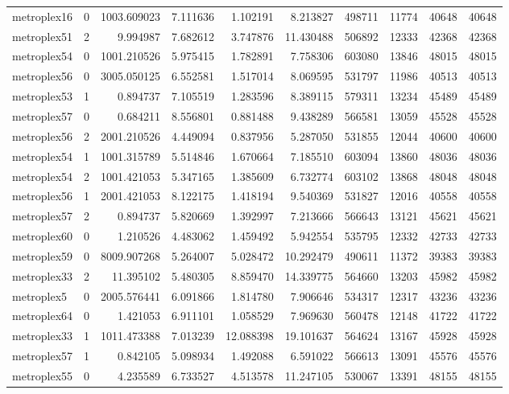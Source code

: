 \begin{longtable}{|l|r|r|r|r|r|r|r|r|r|}
metroplex16 & 0 & 1003.609023 & 7.111636 & 1.102191 & 8.213827 & 498711 & 11774 & 40648 & 40648 \\
metroplex51 & 2 & 9.994987 & 7.682612 & 3.747876 & 11.430488 & 506892 & 12333 & 42368 & 42368 \\
metroplex54 & 0 & 1001.210526 & 5.975415 & 1.782891 & 7.758306 & 603080 & 13846 & 48015 & 48015 \\
metroplex56 & 0 & 3005.050125 & 6.552581 & 1.517014 & 8.069595 & 531797 & 11986 & 40513 & 40513 \\
metroplex53 & 1 & 0.894737 & 7.105519 & 1.283596 & 8.389115 & 579311 & 13234 & 45489 & 45489 \\
metroplex57 & 0 & 0.684211 & 8.556801 & 0.881488 & 9.438289 & 566581 & 13059 & 45528 & 45528 \\
metroplex56 & 2 & 2001.210526 & 4.449094 & 0.837956 & 5.287050 & 531855 & 12044 & 40600 & 40600 \\
metroplex54 & 1 & 1001.315789 & 5.514846 & 1.670664 & 7.185510 & 603094 & 13860 & 48036 & 48036 \\
metroplex54 & 2 & 1001.421053 & 5.347165 & 1.385609 & 6.732774 & 603102 & 13868 & 48048 & 48048 \\
metroplex56 & 1 & 2001.421053 & 8.122175 & 1.418194 & 9.540369 & 531827 & 12016 & 40558 & 40558 \\
metroplex57 & 2 & 0.894737 & 5.820669 & 1.392997 & 7.213666 & 566643 & 13121 & 45621 & 45621 \\
metroplex60 & 0 & 1.210526 & 4.483062 & 1.459492 & 5.942554 & 535795 & 12332 & 42733 & 42733 \\
metroplex59 & 0 & 8009.907268 & 5.264007 & 5.028472 & 10.292479 & 490611 & 11372 & 39383 & 39383 \\
metroplex33 & 2 & 11.395102 & 5.480305 & 8.859470 & 14.339775 & 564660 & 13203 & 45982 & 45982 \\
metroplex5 & 0 & 2005.576441 & 6.091866 & 1.814780 & 7.906646 & 534317 & 12317 & 43236 & 43236 \\
metroplex64 & 0 & 1.421053 & 6.911101 & 1.058529 & 7.969630 & 560478 & 12148 & 41722 & 41722 \\
metroplex33 & 1 & 1011.473388 & 7.013239 & 12.088398 & 19.101637 & 564624 & 13167 & 45928 & 45928 \\
metroplex57 & 1 & 0.842105 & 5.098934 & 1.492088 & 6.591022 & 566613 & 13091 & 45576 & 45576 \\
metroplex55 & 0 & 4.235589 & 6.733527 & 4.513578 & 11.247105 & 530067 & 13391 & 48155 & 48155 \\

\end{longtable}
